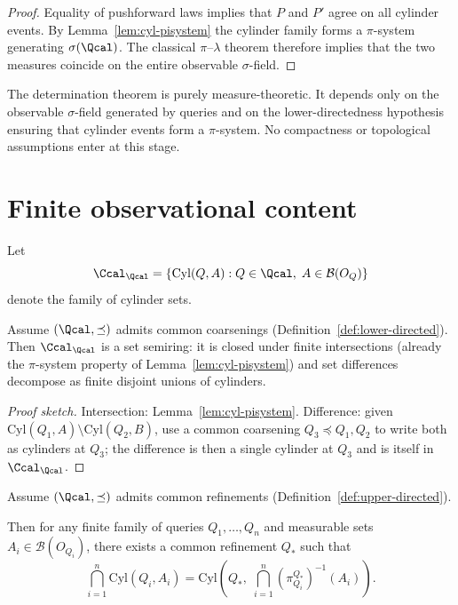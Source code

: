 \begin{proof}
Equality of pushforward laws implies that $P$ and $P'$ agree on all
cylinder events.
By Lemma~\ref{lem:cyl-pisystem} the cylinder family forms a $\pi$-system generating
$\sigma(\Qcal)$.
The classical $\pi$--$\lambda$ theorem therefore implies that the two
measures coincide on the entire observable $\sigma$-field.
\end{proof}

\begin{remark}
The determination theorem is purely measure-theoretic.  It depends
only on the observable $\sigma$-field generated by queries and on
the lower-directedness hypothesis ensuring that cylinder events form
a $\pi$-system.  No compactness or topological assumptions enter
at this stage.
\end{remark}

\section{Finite observational content}

\begin{definition}
Let
\[
\Ccal_{\Qcal}
=
\{\mathrm{Cyl}(Q,A): Q\in\Qcal,\;A\in\mathcal B(O_Q)\}
\]
denote the family of cylinder sets.
\end{definition}

\begin{lemma}
\label{lem:cyl-semiring}
Assume $(\Qcal,\preceq)$ admits common coarsenings
(Definition~\ref{def:lower-directed}).
Then $\Ccal_{\Qcal}$ is a set semiring: it is closed under finite
intersections (already the $\pi$-system property of
Lemma~\ref{lem:cyl-pisystem}) and set differences decompose as finite
disjoint unions of cylinders.
\end{lemma}

\begin{proof}[Proof sketch]
Intersection: Lemma~\ref{lem:cyl-pisystem}.
Difference: given $\mathrm{Cyl}(Q_1,A)\setminus\mathrm{Cyl}(Q_2,B)$,
use a common coarsening $Q_3 \preceq Q_1, Q_2$ to write both as
cylinders at $Q_3$; the difference is then a single cylinder at $Q_3$
and is itself in $\Ccal_{\Qcal}$.
\end{proof}

\begin{lemma}
\label{lem:finite-cylinder}
Assume $(\Qcal,\preceq)$ admits common refinements
(Definition~\ref{def:upper-directed}).

Then for any finite family of queries $Q_1,\ldots,Q_n$ and measurable
sets $A_i\in\mathcal B(O_{Q_i})$, there exists a common refinement
$Q_*$ such that
\[
\bigcap_{i=1}^n \mathrm{Cyl}(Q_i,A_i)
=
\mathrm{Cyl}\!\left(Q_*,\;\bigcap_{i=1}^n (\pi^{Q_*}_{Q_i})^{-1}(A_i)\right).
\]
\end{lemma}

